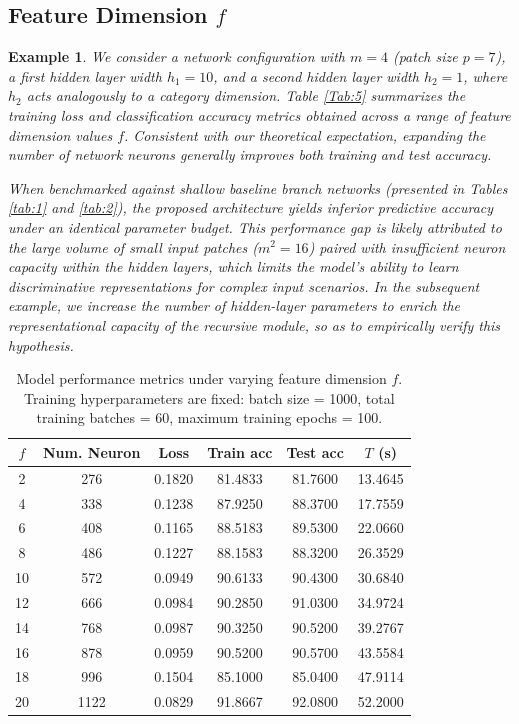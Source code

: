 \documentclass[pdflatex,sn-mathphys-num]{sn-jnl}%
\theoremstyle{thmstyleone}%
\theoremstyle{thmstyletwo}%
\newtheorem{example}{Example}%
\theoremstyle{thmstylethree}%
\begin{document}
\subsection{Feature Dimension $f$}
\begin{example}
We consider a network configuration with $m=4$ (patch size $p=7$), a first hidden layer width $h_1=10$, and a second hidden layer width $h_2=1$, where $h_2$ acts analogously to a category dimension. Table \ref{Tab:5} summarizes the training loss and classification accuracy metrics obtained across a range of feature dimension values $f$. Consistent with our theoretical expectation, expanding the number of network neurons generally improves both training and test accuracy.

When benchmarked against shallow baseline branch networks (presented in Tables \ref{tab:1} and \ref{tab:2}), the proposed architecture yields inferior predictive accuracy under an identical parameter budget. This performance gap is likely attributed to the large volume of small input patches ($m^2=16$) paired with insufficient neuron capacity within the hidden layers, which limits the model's ability to learn discriminative representations for complex input scenarios. In the subsequent example, we increase the number of hidden-layer parameters to enrich the representational capacity of the recursive module, so as to empirically verify this hypothesis.
\end{example}

\begin{table}[htbp]
\centering
\caption{Model performance metrics under varying feature dimension $f$. Training hyperparameters are fixed: batch size = 1000, total training batches = 60, maximum training epochs = 100.}\label{Tab:5}
\label{tab:training_parameters_performance}
\begin{tabular}{cccccc}
\toprule
$f$ &  Num. Neuron & Loss    & Train acc & Test acc & $T$ (s) \\
\midrule
2      & 276  & 0.1820 & 81.4833 & 81.7600 & 13.4645  \\
4      & 338  & 0.1238 & 87.9250 & 88.3700 & 17.7559  \\
6      & 408  & 0.1165 & 88.5183 & 89.5300 & 22.0660  \\
8      & 486  & 0.1227 & 88.1583 & 88.3200 & 26.3529  \\
10     & 572  & 0.0949 & 90.6133 & 90.4300 & 30.6840  \\
12     & 666  & 0.0984 & 90.2850 & 91.0300 & 34.9724  \\
14     & 768  & 0.0987 & 90.3250 & 90.5200 & 39.2767  \\
16     & 878  & 0.0959 & 90.5200 & 90.5700 & 43.5584  \\
18     & 996  & 0.1504 & 85.1000 & 85.0400 & 47.9114  \\
20     & 1122 & 0.0829 & 91.8667 & 92.0800 & 52.2000  \\
\bottomrule
\end{tabular}
\end{table}
\end{document}
